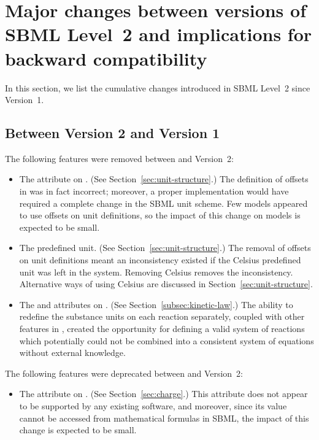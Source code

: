 
\section{Major changes between versions of SBML Level~2 and implications for backward compatibility}
\label{apdx:changes}

In this section, we list the cumulative changes introduced in SBML
Level~2 since Version~1.

\subsection{Between Version 2 and Version 1}

The following features were removed between \sbmltwoone and
Version~2:
\begin{itemize}
  
\item The  attribute on \UnitDefinition.  (See
  Section~\ref{sec:unit-structure}.)  The definition of offsets in
  \sbmltwoone was in fact incorrect; moreover, a proper
  implementation would have required a complete change in the SBML
  unit scheme.  Few models appeared to use offsets on unit
  definitions, so the impact of this change on models is expected
  to be small.
  
\item The  predefined unit.  (See
  Section~\ref{sec:unit-structure}.)  The removal of offsets on
  unit definitions meant an inconsistency existed if the Celsius
  predefined unit was left in the system.  Removing Celsius
  removes the inconsistency.  Alternative ways of using Celsius
  are discussed in Section~\ref{sec:unit-structure}.
  
\item The  and  attributes on
  \KineticLaw.  (See Section~\ref{subsec:kinetic-law}.)  The
  ability to redefine the substance units on each reaction
  separately, coupled with other features in \sbmltwoone, created
  the opportunity for defining a valid system of reactions which
  potentially could not be combined into a consistent system of
  equations without external knowledge.

\end{itemize}

The following features were deprecated between \sbmltwoone and
Version~2:
\begin{itemize}
  
\item The  attribute on \Species.  (See
  Section~\ref{sec:charge}.)  This attribute does not appear to be
  supported by any existing software, and moreover, since its
  value cannot be accessed from mathematical formulas in SBML, the
  impact of this change is expected to be small.

\end{itemize}

